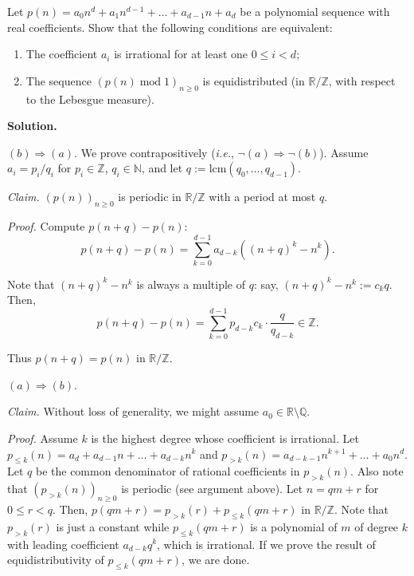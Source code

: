 \documentclass{template}
\begin{document}
\begin{problem}[Exercise 3]
    Let $p(n) = a_0n^d + a_1n^{d-1} + \dots + a_{d-1}n+a_d$ be a polynomial
    sequence with real coefficients. Show that the following conditions 
    are equivalent:
    \begin{enumerate}
        \item[(a)] The coefficient $a_i$ is irrational for at least one $0 \leq i < d$;
        \item[(b)] The sequence $(p(n) \; \text{mod} \; 1)_{n \geq 0}$ is equidistributed (in $\mathbb{R}/\mathbb{Z}$, with respect to the Lebesgue measure). 
    \end{enumerate}
\end{problem}

\textbf{Solution.} 

\underline{$(b) \Rightarrow (a)$}. We prove contrapositively (\textit{i.e.}, $\neg(a) \Rightarrow \neg(b)$).
Assume $a_i=p_i/q_i$ for $p_i \in \mathbb{Z}$, $q_i \in \mathbb{N}$, and let $q := \text{lcm}(q_0,\dots,q_{d-1})$.

\textit{Claim.} $(p(n))_{n \geq 0}$ is periodic in $\mathbb{R}/\mathbb{Z}$ with a period at most $q$.

\textit{Proof.} Compute $p(n+q)-p(n)$:
\begin{equation*}
    p(n+q) - p(n) = \sum_{k=0}^{d-1} a_{d-k}((n+q)^k - n^k).
\end{equation*}

Note that $(n+q)^k-n^k$ is always a multiple of $q$: say, $(n+q)^k-n^k := c_kq$. Then,
\begin{equation*}
    p(n+q) - p(n) = \sum_{k=0}^{d-1} p_{d-k}c_k \cdot \frac{q}{q_{d-k}} \in \mathbb{Z}.
\end{equation*}

Thus $p(n+q)=p(n)$ in $\mathbb{R}/\mathbb{Z}$.

\underline{$(a) \Rightarrow (b)$}. 

\textit{Claim.} Without loss of generality, we might assume $a_0 \in \mathbb{R} \setminus \mathbb{Q}$.

\textit{Proof.} Assume $k$ is the highest degree whose coefficient is
irrational. Let $p_{\leq k}(n) = a_d + a_{d-1}n + \dots + a_{d-k}n^k$ and
$p_{>k}(n)=a_{d-k-1}n^{k+1} + \dots + a_0n^d$. Let $q$ be the common denominator
of rational coefficients in $p_{>k}(n)$. Also note that $(p_{>k}(n))_{n \geq 0}$
is periodic (see argument above). Let $n=qm+r$ for $0 \leq r<q$. Then, $p(qm+r) =
p_{>k}(r) + p_{\leq k}(qm+r)$ in $\mathbb{R}/\mathbb{Z}$. Note that $p_{>k}(r)$
is just a constant while $p_{\leq k}(qm+r)$ is a polynomial of $m$ of degree $k$
with leading coefficient $a_{d-k}q^k$, which is irrational. If we prove the
result of equidistributivity of $p_{\leq k}(qm+r)$, we are done. 
\end{document}
